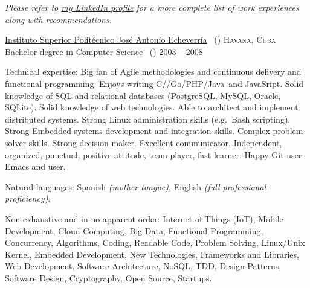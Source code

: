 \documentclass[10pt,a4paper]{article}
\begin{document}
\vspace{-0.2em}
\begin{center}
  \emph{\small Please refer to \href{http://www.linkedin.com/in/jvillasante}{my LinkedIn profile} for a more complete list of work experiences along with recommendations.}
\end{center}


\spacedhrule{-0.2em}{-0.4em}


\headedsection
  {\href{http://cujae.edu.cu}{Instituto Superior Polit\'ecnico Jos\'e Antonio Echeverr\'ia} \textnormal{~()}}
  {\textsc{Havana, Cuba}} {%
  \headedsubsection
    {Bachelor degree in Computer Science \textnormal{~()}}
    {2003 -- 2008}
    {}
}

\spacedhrule{0.5em}{-0.4em}


\inlineheadsection  %
  {Technical expertise:}
  {Big fan of Agile methodologies and continuous delivery and functional programming. Enjoys writing C/\nsp \CPP/\nsp Go/\nsp PHP/\nsp Java~and JavaSript. Solid knowledge of SQL and relational databases (PostgreSQL, MySQL, Oracle, SQLite). Solid knowledge of web technologies. Able to architect and implement distributed systems. Strong Linux administration skills (e.g.\ Bash scripting). Strong Embedded systems development and integration skills. Complex problem solver skills. Strong decision maker. Excellent communicator. Independent, organized, punctual, positive attitude, team player, fast learner. Happy Git user. Emacs and  user.}

\vspace{0.5em}
\inlineheadsection
  {Natural languages:}
  {Spanish \emph{(mother tongue)}, English \emph{(full professional proficiency)}.}


\spacedhrule{1.6em}{-0.4em}


\inlineheadsection
  {Non-exhaustive and in no apparent order:}
  {Internet of Things (IoT), Mobile Development, Cloud Computing, Big Data, Functional Programming, Concurrency, Algorithms, Coding, Readable Code, Problem Solving, Linux/Unix Kernel, Embedded Development, New Technologies, Frameworks and Libraries, Web Development, Software Architecture, NoSQL, TDD, Design Patterns, Software Design, Cryptography, Open Source, Startups.}
\end{document}
